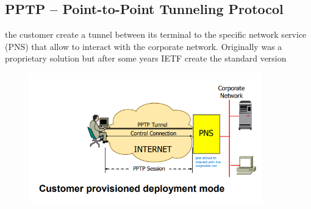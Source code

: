 \documentclass{article}
\begin{document}
\subsection{PPTP – Point-to-Point Tunneling Protocol}
the customer create a tunnel between its terminal to the specific network service (PNS) that allow to interact with the corporate network. Originally was a proprietary solution but after some years IETF create the standard version
\begin{figure}[H]
    \centering
    \includegraphics[width=0.90\textwidth]{figure/PPTP.png}
\end{figure}
\end{document}
